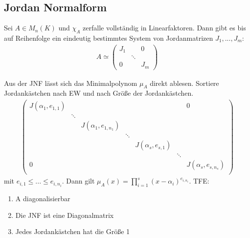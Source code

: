 \subsection{Jordan Normalform}
Sei $A \in M_n(K)$ und $\chi_A$ zerfalle vollständig in Linearfaktoren. Dann gibt es bis auf Reihenfolge ein eindeutig bestimmtes System von Jordanmatrizen $J_1,...,J_m$:
\begin{align*}
A \simeq 
\begin{pmatrix}
J_1 & & 0\\
    & \ddots & \\
0   &        & J_m
\end{pmatrix}
\end{align*}
\begin{remark}
Aus der JNF lässt sich das Minimalpolynom $\mu_A$ direkt ablesen. Sortiere Jordankästchen nach EW und nach Größe der Jordankästchen.
\begin{align*}
\begin{pmatrix}
J(\alpha_1,e_{1,1}) & & & & & & 0\\
& \ddots & & & & & \\
 & & J(\alpha_1,e_{1,n_1}) & & & & \\
 & & & \ddots & & & \\
 & & & & J(\alpha_s,e_{s,1}) & &\\
 & & & & & \ddots & \\
0 & & & & & & J(\alpha_s,e_{s,n_s}) \\
\end{pmatrix}
\end{align*}
mit $e_{i,1} \leq ... \leq e_{i,n_i}$. Dann gilt $\mu_A(x)=\prod \limits_{i=1}^s (x-\alpha_i)^{e_{i,n_i}}$. TFE:
\begin{enumerate}
	\item A diagonalisierbar
	\item Die JNF ist eine Diagonalmatrix
	\item Jedes Jordankästchen hat die Größe 1
\end{enumerate}
\end{remark}
